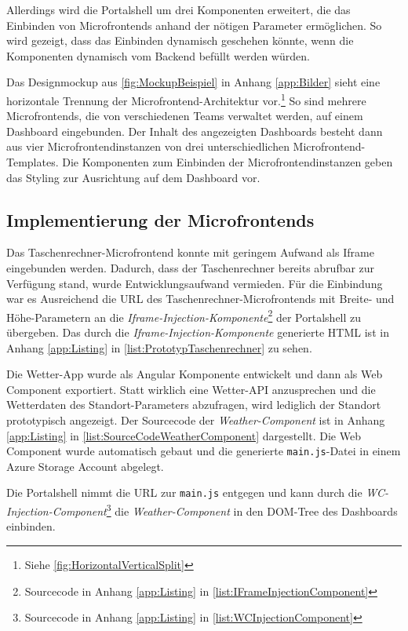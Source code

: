 Allerdings wird die Portalshell um drei Komponenten erweitert, die das Einbinden von Microfrontends anhand der nötigen Parameter ermöglichen. So wird gezeigt, dass das Einbinden dynamisch geschehen könnte, wenn die Komponenten dynamisch vom Backend befüllt werden würden.

Das Designmockup aus \cref{fig:MockupBeispiel} in Anhang \ref{app:Bilder} sieht eine horizontale Trennung der Microfrontend-Architektur vor.\footnote{Siehe \cref{fig:HorizontalVerticalSplit}} So sind mehrere Microfrontends, die von verschiedenen Teams verwaltet werden, auf einem Dashboard eingebunden. Der Inhalt des angezeigten Dashboards besteht dann aus vier Microfrontendinstanzen von drei unterschiedlichen Microfrontend-Templates. Die Komponenten zum Einbinden der Microfrontendinstanzen geben das Styling zur Ausrichtung auf dem Dashboard vor.

\subsection{Implementierung der Microfrontends}\label{sec:ImplementierungEinbindungMicrofrontends}

Das Taschenrechner-Microfrontend konnte mit geringem Aufwand als Iframe eingebunden werden. Dadurch, dass der Taschenrechner bereits abrufbar zur Verfügung stand, wurde Entwicklungsaufwand vermieden. Für die Einbindung war es Ausreichend die \gls{URL} des Taschenrechner-Microfrontends mit Breite- und Höhe-Parametern an die \textit{Iframe-Injection-Komponente}\footnote{Sourcecode in Anhang \ref{app:Listing} in \cref{list:IFrameInjectionComponent}} der Portalshell zu übergeben. Das durch die \textit{Iframe-Injection-Komponente} generierte \gls{HTML} ist in Anhang \ref{app:Listing} in \cref{list:PrototypTaschenrechner} zu sehen.

Die Wetter-App wurde als Angular Komponente entwickelt und dann als Web Component exportiert. Statt wirklich eine Wetter-\gls{API} anzusprechen und die Wetterdaten des Standort-Parameters abzufragen, wird lediglich der Standort prototypisch angezeigt. Der Sourcecode der \textit{Weather-Component} ist in Anhang \ref{app:Listing} in \cref{list:SourceCodeWeatherComponent} dargestellt. Die Web Component wurde automatisch gebaut und die generierte \texttt{main.js}-Datei in einem Azure Storage Account abgelegt. 

Die Portalshell nimmt die \gls{URL} zur \texttt{main.js} entgegen und kann durch die \textit{WC-Injection-\linebreak Component}\footnote{Sourcecode in Anhang \ref{app:Listing} in \cref{list:WCInjectionComponent}} die \textit{Weather-Component} in den \gls{DOM}-Tree des Dashboards einbinden.

